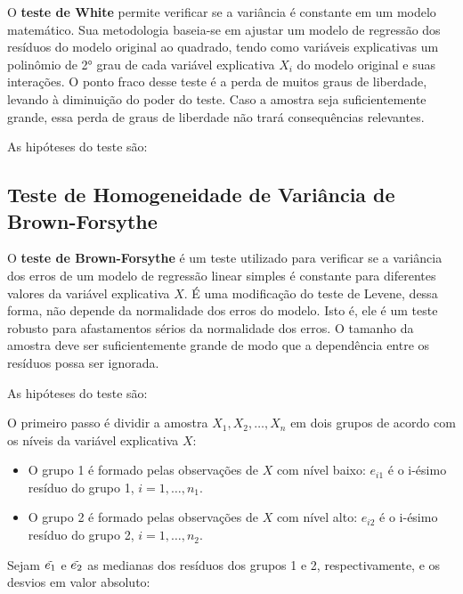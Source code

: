 \documentclass[
]{estat/estat}
\providecommand{\tightlist}{%
  \setlength{\itemsep}{0pt}\setlength{\parskip}{0pt}}\usepackage{longtable,booktabs,array}
\begin{document}
O \textbf{teste de White} permite verificar se a variância é constante
em um modelo matemático. Sua metodologia baseia-se em ajustar um modelo
de regressão dos resíduos do modelo original ao quadrado, tendo como
variáveis explicativas um polinômio de 2° grau de cada variável
explicativa \(X_i\) do modelo original e suas interações. O ponto fraco
desse teste é a perda de muitos graus de liberdade, levando à diminuição
do poder do teste. Caso a amostra seja suficientemente grande, essa
perda de graus de liberdade não trará consequências relevantes.

As hipóteses do teste são:


\subsection{Teste de Homogeneidade de Variância de
Brown-Forsythe}\label{teste-de-homogeneidade-de-variuxe2ncia-de-brown-forsythe}

O \textbf{teste de Brown-Forsythe} é um teste utilizado para verificar
se a variância dos erros de um modelo de regressão linear simples é
constante para diferentes valores da variável explicativa \(X\). É uma
modificação do teste de Levene, dessa forma, não depende da normalidade
dos erros do modelo. Isto é, ele é um teste robusto para afastamentos
sérios da normalidade dos erros. O tamanho da amostra deve ser
suficientemente grande de modo que a dependência entre os resíduos possa
ser ignorada.

As hipóteses do teste são:


O primeiro passo é dividir a amostra \(X_1, X_2, \ldots, X_n\) em dois
grupos de acordo com os níveis da variável explicativa \(X\):

\begin{itemize}
\tightlist
\item
  O grupo 1 é formado pelas observações de \(X\) com nível baixo:
  \(e_{i1}\) é o i-ésimo resíduo do grupo 1, \(i = 1, \ldots, n_1\).
\item
  O grupo 2 é formado pelas observações de \(X\) com nível alto:
  \(e_{i2}\) é o i-ésimo resíduo do grupo 2, \(i = 1, \ldots, n_2\).
\end{itemize}

Sejam \(\Tilde{e_1}\) e \(\Tilde{e_2}\) as medianas dos resíduos dos
grupos 1 e 2, respectivamente, e os desvios em valor absoluto:
\end{document}
